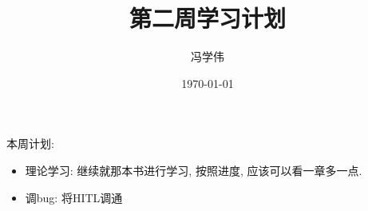 \documentclass[UTF8,a4paper,10pt,nocolorlinks]{ctexart}
\title{
    \huge{\textbf{第二周学习计划}}\\
}
\author{冯学伟}
\date{\today}
\begin{document}
    \maketitle
    
   
    本周计划: 
    \begin{itemize}
      \item 理论学习: 继续就那本书进行学习, 按照进度, 应该可以看一章多一点.
      \item 调bug: 将HITL调通
    \end{itemize}
\end{document}
